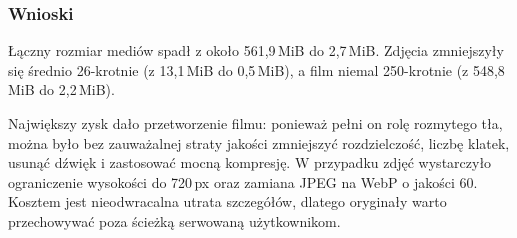 \subsubsection{Wnioski}

Łączny rozmiar mediów spadł z około 561,9\,MiB do 2,7\,MiB. Zdjęcia zmniejszyły się
średnio 26-krotnie (z 13,1\,MiB do 0,5\,MiB), a film niemal 250-krotnie
(z 548,8\,MiB do 2,2\,MiB).

Największy zysk dało przetworzenie filmu: ponieważ pełni on rolę rozmytego tła,
można było bez zauważalnej straty jakości zmniejszyć rozdzielczość, liczbę klatek,
usunąć dźwięk i zastosować mocną kompresję. W przypadku zdjęć wystarczyło
ograniczenie wysokości do 720\,px oraz zamiana JPEG na WebP o jakości 60.
Kosztem jest nieodwracalna utrata szczegółów, dlatego oryginały warto
przechowywać poza ścieżką serwowaną użytkownikom.
